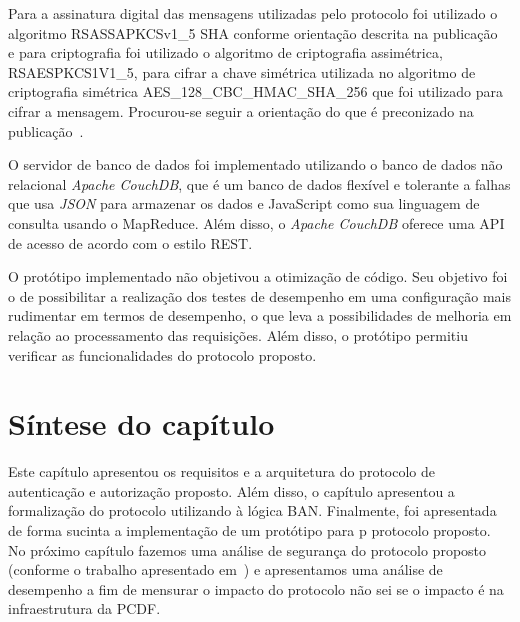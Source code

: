 Para a assinatura digital das mensagens utilizadas pelo protocolo foi utilizado o algoritmo RSASSA\-PKCS\-v1\_5 SHA conforme orientação descrita na publicação~\cite{ietfjws} e para criptografia foi utilizado o algoritmo de criptografia assimétrica, RSAES\-PKCS1\-V1\_5, para cifrar a chave simétrica utilizada no algoritmo de criptografia simétrica AES\_128\_CBC\_HMAC\_SHA\_256 que foi utilizado para cifrar a mensagem. Procurou-se seguir a orientação do que é preconizado na publicação~\cite{jwt2014}.

O servidor de banco de dados foi implementado utilizando o banco de dados não relacional \emph{Apache CouchDB}, que é um banco de dados flexível e tolerante a falhas que usa \emph{JSON} para armazenar os dados e JavaScript como sua linguagem de consulta usando o MapReduce. Além disso, o \emph{Apache CouchDB} 
oferece uma API de acesso de acordo com o estilo REST.

O protótipo implementado não objetivou a otimização de c\'{o}digo. Seu objetivo foi o de possibilitar a realização dos testes de desempenho em uma configura\c c\~{a}o 
mais rudimentar em termos de desempenho, o que leva a possibilidades de melhoria em rela\c c\~{a}o ao processamento das requisi\c c\~{o}es. 
Al\'{e}m disso, o prot\'{o}tipo permitiu verificar as funcionalidades do protocolo proposto.


\section{Síntese do capítulo}

Este capítulo apresentou os requisitos e a arquitetura do protocolo de autenticação e autorização proposto. Além disso,  o capítulo apresentou a formalização do protocolo utilizando à lógica BAN. Finalmente, foi apresentada de forma sucinta a implementação de um protótipo para p protocolo proposto. No próximo capítulo fazemos uma 
análise de seguran\c ca do protocolo proposto 
(conforme o trabalho apresentado em~\cite{traust08}) e apresentamos uma an\'{a}lise de 
desempenho a fim de mensurar o impacto do protocolo {\color{red}n\~{a}o sei se o impacto \'{e}} 
na infraestrutura da PCDF. 
